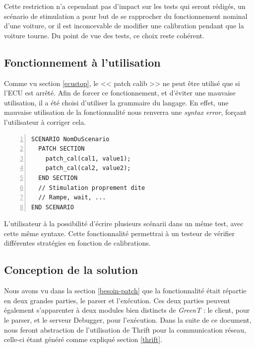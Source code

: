 		Cette restriction n'a cependant pas d'impact sur les tests qui seront rédigés, un scénario de stimulation a pour but de se rapprocher du fonctionnement nominal d'une voiture, or il est inconcevable de modifier une calibration pendant que la voiture tourne. Du point de vue des tests, ce choix reste cohérent. 

\subsection{Fonctionnement à l'utilisation}\label{usePatch}
Comme vu section \ref{ecustop}, le << patch calib >> ne peut être utilisé que si l'ECU est arrêté. Afin de forcer ce fonctionnement, et d'éviter une mauvaise utilisation, il a été choisi d'utiliser la grammaire du langage. En effet, une mauvaise utilisation de la fonctionnalité nous renverra une \textit{syntax error}, forçant l'utilisateur à corriger cela. 

\begin{lstlisting}[language=gtl,numbers=left,caption=Scénario de stimulation contenant des patchs de calibration]
SCENARIO NomDuScenario
  PATCH SECTION
    patch_cal(cal1, value1);
    patch_cal(cal2, value2);
  END SECTION
  // Stimulation proprement dite
  // Rampe, wait, ...
END SCENARIO
\end{lstlisting}
L'utilisateur à la possibilité d'écrire plusieurs scénarii dans un même test, avec cette même syntaxe. Cette fonctionnalité permettrai à un testeur de vérifier différentes stratégies en fonction de calibrations.

\subsection{Conception de la solution}
	Nous avons vu dans la section \ref{besoin-patch} que la fonctionnalité était répartie en deux grandes parties, le parser et l'exécution. Ces deux parties peuvent également s'apparenter à deux modules bien distincts de \textit{GreenT} : le client, pour le parser, et le serveur Debugger, pour l'exécution. Dans la suite de ce document, nous feront abstraction de l'utilisation de Thrift pour la communication réseau, celle-ci étant généré comme expliqué section \ref{thrift}.
	
